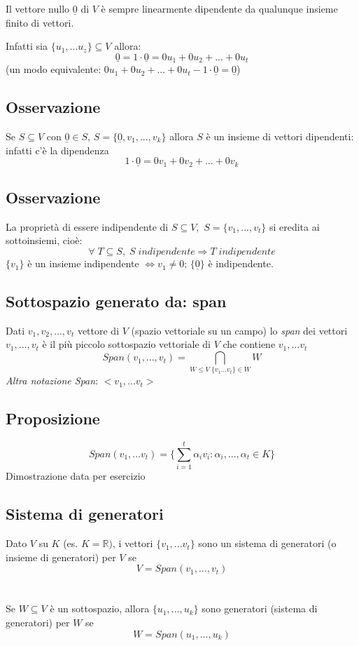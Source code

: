 Il vettore nullo \(\underline{0}\) di \(V\) è sempre linearmente dipendente da qualunque insieme finito di vettori.

Infatti sia \(\{u_1,...u_z\}\subseteq V\) allora:
\[\underline{0}=1\cdot\underline{0}=0u_1+0u_2+...+0u_t\]
(un modo equivalente: \(0u_1+0u_2+...+0u_t-1\cdot\underline{0}=\underline{0}\))

\subsection{Osservazione}
Se \(S\subseteq V\) con \(\underline{0}\in S\), \(S=\{\underline{0},v_1,...,v_k\}\) allora \(S\) è un insieme di vettori dipendenti: infatti c'è la dipendenza
\[1\cdot\underline{0}=0v_1+0v_2+...+0v_k\]

\subsection{Osservazione}

La proprietà di essere indipendente di \(S\subseteq V,\) \(S=\{v_1,...,v_t\}\) si eredita ai sottoinsiemi, cioè:
\[\forall\; T\subseteq S,\;S\;indipendente\Rightarrow T\;indipendente\]
\(\{v_1\}\) è un insieme indipendente \(\Leftrightarrow v_1\neq 0\); \(\{\underline{0}\}\) è indipendente.

\subsection{Sottospazio generato da: span}
Dati \(v_1,v_2,...,v_t\) vettore di \(V\) (spazio vettoriale su un campo) lo \textit{span} dei vettori \(v_1,...,v_t\) è il più piccolo sottospazio vettoriale di \(V\) che contiene \(v_1,...v_t\)
\[Span(v_1,...,v_t)=\bigcap _{W\leq V\;\{v_1...v_t\}\in W} W\]
\textit{Altra notazione Span}: \(<v_1,...v_t>\)

\subsection{Proposizione}
\[Span(v_1,...v_t)=\{\sum _{i=1} ^t\alpha _iv_i:\alpha _i,...,\alpha _t\in K\}\]
Dimostrazione data per esercizio

\subsection{Sistema di generatori}
Dato \(V\) su \(K\) (es. \(K=\mathbb{R})\), i vettori \(\{v_1,...v_t\}\) sono un sistema di generatori (o insieme di generatori) per \(V\) se 
\[V=Span(v_1,...,v_t)\]
\\
\\Se \(W\subseteq V\) è un sottospazio, allora \(\{u_1,...,u_k\}\) sono generatori (sistema di generatori) per \(W\) se
\[W=Span(u_1,...,u_k)\]

